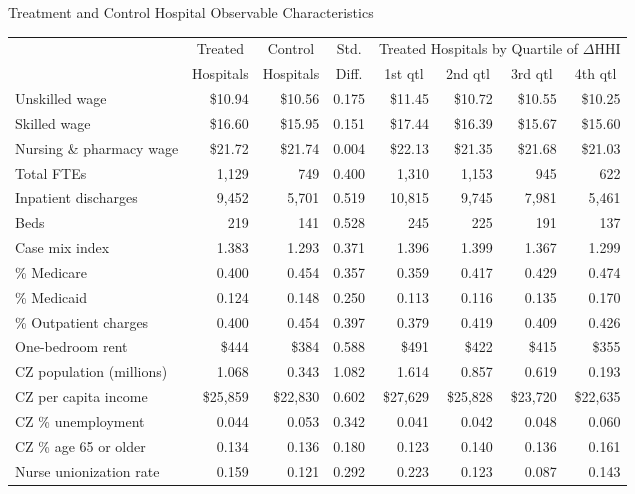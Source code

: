 \documentclass{beamer}
\begin{document}
\begin{frame}{Treatment and Control Hospital Observable Characteristics}
\scriptsize %
\setlength{\tabcolsep}{3pt} %
\renewcommand{\arraystretch}{0.9} %

\begin{tabular}{lrrrrrrr}
\toprule
& \multicolumn{1}{c}{Treated} & \multicolumn{1}{c}{Control} & \multicolumn{1}{c}{Std.} & \multicolumn{4}{c}{Treated Hospitals by Quartile of $\Delta$HHI} \\
& \multicolumn{1}{c}{Hospitals} & \multicolumn{1}{c}{Hospitals} & \multicolumn{1}{c}{Diff.} & \multicolumn{1}{c}{1st qtl} & \multicolumn{1}{c}{2nd qtl} & \multicolumn{1}{c}{3rd qtl} & \multicolumn{1}{c}{4th qtl} \\
\midrule
Unskilled wage           & \$10.94 & \$10.56 & 0.175 & \$11.45 & \$10.72 & \$10.55 & \$10.25 \\
Skilled wage             & \$16.60 & \$15.95 & 0.151 & \$17.44 & \$16.39 & \$15.67 & \$15.60 \\
Nursing \& pharmacy wage & \$21.72 & \$21.74 & 0.004 & \$22.13 & \$21.35 & \$21.68 & \$21.03 \\
Total FTEs               & 1{,}129 &   749   & 0.400 & 1{,}310 & 1{,}153 &   945   &   622   \\
Inpatient discharges     & 9{,}452 & 5{,}701 & 0.519 & 10{,}815 & 9{,}745 & 7{,}981 & 5{,}461 \\
Beds                     &   219   &   141   & 0.528 &   245   &   225   &   191   &   137  \\
Case mix index           &  1.383  &  1.293  & 0.371 &  1.396  &  1.399  &  1.367  &  1.299 \\
\% Medicare              &  0.400  &  0.454  & 0.357 &  0.359  &  0.417  &  0.429  &  0.474 \\
\% Medicaid              &  0.124  &  0.148  & 0.250 &  0.113  &  0.116  &  0.135  &  0.170 \\
\% Outpatient charges    &  0.400  &  0.454  & 0.397 &  0.379  &  0.419  &  0.409  &  0.426 \\
One-bedroom rent         & \$444   & \$384   & 0.588 & \$491   & \$422   & \$415   & \$355  \\
CZ population (millions) &  1.068  &  0.343  & 1.082 &  1.614  &  0.857  &  0.619  &  0.193 \\
CZ per capita income     & \$25{,}859 & \$22{,}830 & 0.602 & \$27{,}629 & \$25{,}828 & \$23{,}720 & \$22{,}635 \\
CZ \% unemployment       &  0.044  &  0.053  & 0.342 &  0.041  &  0.042  &  0.048  &  0.060 \\
CZ \% age 65 or older    &  0.134  &  0.136  & 0.180 &  0.123  &  0.140  &  0.136  &  0.161 \\
Nurse unionization rate  &  0.159  &  0.121  & 0.292 &  0.223  &  0.123  &  0.087  &  0.143 \\
\bottomrule
\end{tabular}


\end{frame}
\end{document}

